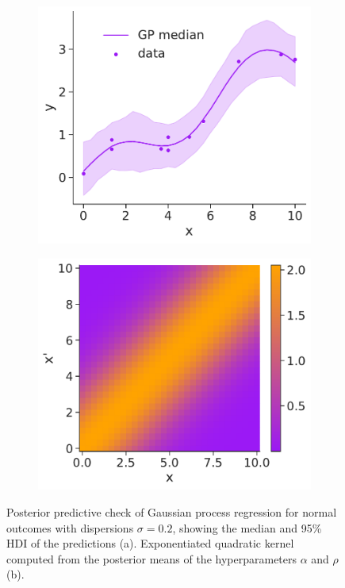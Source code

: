 \begin{figure}[t]
    \begin{subfigure}[b]{0.5\linewidth}
    \includegraphics[width=\linewidth]{figures/ch2/GP/GP_0.pdf}
\caption{}
\end{subfigure}
\hfill
\begin{subfigure}[b]{0.5\linewidth}
\includegraphics[width=\linewidth]{figures/ch2/GP/kernel_0.pdf}
\caption{}
\end{subfigure}
\caption{Posterior predictive check of Gaussian process regression for normal outcomes with dispersions $\sigma=0.2$, showing the median and 95\%
HDI of the predictions (a). Exponentiated quadratic kernel computed from the posterior means of the hyperparameters \(\alpha\) and \(\rho\)
(b).} 
\label{fig:GP}
\end{figure}

